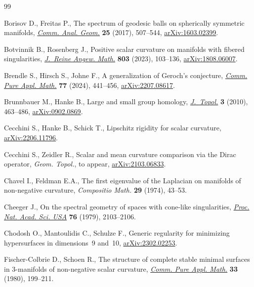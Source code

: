 \begin{thebibliography}{99}
\footnotesize\itemsep=0pt

Borisov D., Freitas P., The spectrum of geodesic balls on spherically symmetric
  manifolds, \href{https://doi.org/10.4310/CAG.2017.v25.n3.a1}{\textit{Comm. Anal. Geom.}} \textbf{25} (2017), 507--544,
  \href{https://arxiv.org/abs/1603.02399}{arXiv:1603.02399}.

Botvinnik B., Rosenberg J., Positive scalar curvature on manifolds with fibered
  singularities, \href{https://doi.org/10.1515/crelle-2023-0055}{\textit{J.~Reine Angew. Math.}} \textbf{803} (2023), 103--136,
  \href{https://arxiv.org/abs/1808.06007}{arXiv:1808.06007}.

Brendle S., Hirsch S., Johne F., A generalization of {G}eroch's conjecture,
  \href{https://doi.org/10.1002/cpa.22137}{\textit{Comm. Pure Appl. Math.}} \textbf{77} (2024), 441--456,
  \href{https://arxiv.org/abs/2207.08617}{arXiv:2207.08617}.

Brunnbauer M., Hanke B., Large and small group homology, \href{https://doi.org/10.1112/jtopol/jtq014}{\textit{J.~Topol.}}
  \textbf{3} (2010), 463--486, \href{https://arxiv.org/abs/0902.0869}{arXiv:0902.0869}.

Cecchini S., Hanke B., Schick T., Lipschitz rigidity for scalar curvature,
  \href{https://arxiv.org/abs/2206.11796}{arXiv:2206.11796}.

Cecchini S., Zeidler R., Scalar and mean curvature comparison via the {D}irac
  operator, \textit{Geom. Topol.}, {t}o appear, \href{https://arxiv.org/abs/2103.06833}{arXiv:2103.06833}.

Chavel I., Feldman E.A., The first eigenvalue of the {L}aplacian on manifolds
  of non-negative curvature, \textit{Compositio Math.} \textbf{29} (1974),
  43--53.

Cheeger J., On the spectral geometry of spaces with cone-like singularities,
  \href{https://doi.org/10.1073/pnas.76.5.2103}{\textit{Proc. Nat. Acad. Sci. USA}} \textbf{76} (1979), 2103--2106.

Chodosh O., Mantoulidis C., Schulze F., Generic regularity for minimizing
  hypersurfaces in dimensions~9 and~10, \href{https://arxiv.org/abs/2302.02253}{arXiv:2302.02253}.

Fischer-Colbrie D., Schoen R., The structure of complete stable minimal
  surfaces in {$3$}-manifolds of non-negative scalar curvature, \href{https://doi.org/10.1002/cpa.3160330206}{\textit{Comm.
  Pure Appl. Math.}} \textbf{33} (1980), 199--211.


\end{thebibliography}
